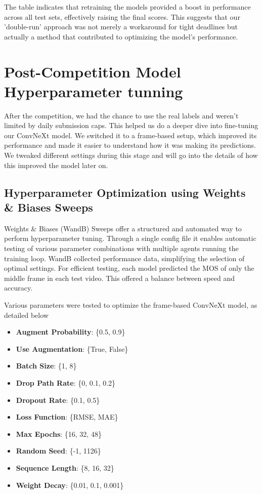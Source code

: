 \documentclass[a4paper,12pt,openright]{book}
\begin{document}
The table indicates that retraining the models provided a boost in performance across all test sets, effectively raising the final scores. This suggests that our 'double-run' approach was not merely a workaround for tight deadlines but actually a method that contributed to optimizing the model's performance.


\section{Post-Competition Model Hyperparameter tunning}
After the competition, we had the chance to use the real labels and weren't limited by daily submission caps. This helped us do a deeper dive into fine-tuning our ConvNeXt model. We switched it to a frame-based setup, which improved its performance and made it easier to understand how it was making its predictions. We tweaked different settings during this stage and will go into the details of how this improved the model later on.

\subsection{Hyperparameter Optimization using Weights \& Biases Sweeps}
Weights \& Biases (WandB) Sweeps offer a structured and automated way to perform hyperparameter tuning. Through a single config file it enables automatic testing of various parameter combinations with multiple agents running the training loop. WandB collected performance data, simplifying the selection of optimal settings. For efficient testing, each model predicted the MOS of only the middle frame in each test video. This offered a balance between speed and accuracy.

Various parameters were tested to optimize the frame-based ConvNeXt model, as detailed below
\begin{itemize}
    \item \textbf{Augment Probability}: \{0.5, 0.9\}
    \item \textbf{Use Augmentation}: \{True, False\}
    \item \textbf{Batch Size}: \{1, 8\}
    \item \textbf{Drop Path Rate}: \{0, 0.1, 0.2\}
    \item \textbf{Dropout Rate}: \{0.1, 0.5\}
    \item \textbf{Loss Function}: \{RMSE, MAE\}
    \item \textbf{Max Epochs}: \{16, 32, 48\}
    \item \textbf{Random Seed}: \{-1, 1126\}
    \item \textbf{Sequence Length}: \{8, 16, 32\}
    \item \textbf{Weight Decay}: \{0.01, 0.1, 0.001\}
\end{itemize}
\end{document}
